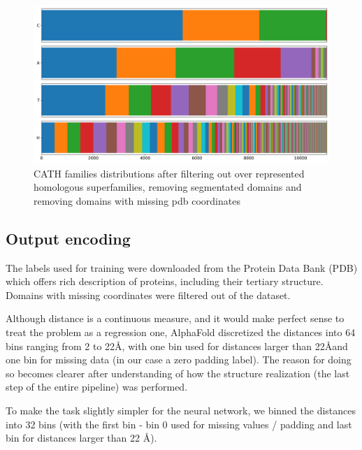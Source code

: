 \begin{figure}
    \centering
    \includegraphics[width=\linewidth]{imgs_tomas/cath_distributions_filtered.png}
    \caption{CATH families distributions after filtering out over represented homologous superfamilies, removing segmentated domains and removing domains with missing pdb coordinates}
    \label{fig:cath_filtered}
\end{figure}

\subsection{Output encoding}

The labels used for training were downloaded from the Protein Data Bank (PDB) which offers rich description of proteins, including their tertiary structure. Domains with missing coordinates were filtered out of the dataset.
        

Although distance is a continuous measure, and it would make perfect sense to treat the problem as a regression one, AlphaFold discretized the distances into 64 bins ranging from 2 to 22\AA, with one bin used for distances larger than 22\AA and one bin for missing data (in our case a zero padding label). 
The reason for doing so becomes clearer after understanding of how the structure realization (the last step of the entire pipeline) was performed.

To make the task slightly simpler for the neural network, we binned the distances into 32 bins (with the first bin - bin 0 used for missing values / padding and last bin for distances larger than 22 \AA).
        
